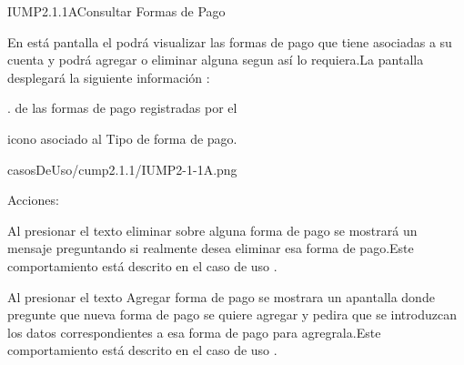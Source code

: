 \begin{IU}{IUMP2.1.1A}{Consultar Formas de Pago}{En está pantalla el  podrá visualizar las formas de pago que tiene asociadas a su cuenta y podrá agregar  o eliminar alguna segun así lo requiera.La pantalla desplegará la siguiente información :
	\begin{Citemize}
		\item {}. de las formas de pago registradas por el 
		\item icono asociado al Tipo de forma de pago.
	\end{Citemize}}
{casosDeUso/cump2.1.1/IUMP2-1-1A.png}
	\item[Acciones:]
		\item {}Al presionar el texto eliminar sobre alguna forma de pago se mostrará un mensaje preguntando si realmente desea eliminar esa forma de pago.Este comportamiento está descrito en el caso de uso .
		\item {} Al presionar el texto Agregar forma de pago se mostrara un apantalla donde pregunte que nueva forma de pago se quiere agregar y pedira que se introduzcan los datos correspondientes a esa forma de pago para agregrala.Este comportamiento está descrito en el caso de uso  .
\end{IU}
